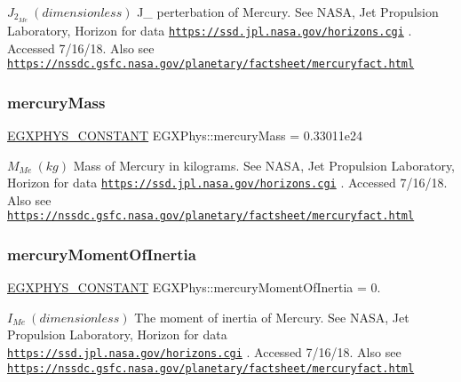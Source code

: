 $ J_{2}_{Me} \ (dimensionless)$ J\+\_ perterbation of Mercury. See N\+A\+SA, Jet Propulsion Laboratory, Horizon for data \href{https://ssd.jpl.nasa.gov/horizons.cgi}{\tt https\+://ssd.\+jpl.\+nasa.\+gov/horizons.\+cgi} . Accessed 7/16/18. Also see \href{https://nssdc.gsfc.nasa.gov/planetary/factsheet/mercuryfact.html}{\tt https\+://nssdc.\+gsfc.\+nasa.\+gov/planetary/factsheet/mercuryfact.\+html} \mbox{\label{group___e_g_x_phys-_constants-_astrophysics-_solar_system-_mercury-_bulk_gaa73eef341356108966e9633c7a70a992}} 
\subsubsection{\texorpdfstring{mercury\+Mass}{mercuryMass}}
{\footnotesize\ttfamily \mbox{\hyperlink{group___e_g_x_phys-_constants-_macros_ga76980d288494ce1714c9ac68a95ba702}{E\+G\+X\+P\+H\+Y\+S\+\_\+\+C\+O\+N\+S\+T\+A\+NT}} E\+G\+X\+Phys\+::mercury\+Mass = 0.\+33011e24}

$M_{Me} \ (kg)$ Mass of Mercury in kilograms. See N\+A\+SA, Jet Propulsion Laboratory, Horizon for data \href{https://ssd.jpl.nasa.gov/horizons.cgi}{\tt https\+://ssd.\+jpl.\+nasa.\+gov/horizons.\+cgi} . Accessed 7/16/18. Also see \href{https://nssdc.gsfc.nasa.gov/planetary/factsheet/mercuryfact.html}{\tt https\+://nssdc.\+gsfc.\+nasa.\+gov/planetary/factsheet/mercuryfact.\+html} \mbox{\label{group___e_g_x_phys-_constants-_astrophysics-_solar_system-_mercury-_bulk_ga54c31fac4e496e9e237656a5a24d6092}} 
\subsubsection{\texorpdfstring{mercury\+Moment\+Of\+Inertia}{mercuryMomentOfInertia}}
{\footnotesize\ttfamily \mbox{\hyperlink{group___e_g_x_phys-_constants-_macros_ga76980d288494ce1714c9ac68a95ba702}{E\+G\+X\+P\+H\+Y\+S\+\_\+\+C\+O\+N\+S\+T\+A\+NT}} E\+G\+X\+Phys\+::mercury\+Moment\+Of\+Inertia = 0.}

$ I_{Me} \ (dimensionless)$ The moment of inertia of Mercury. See N\+A\+SA, Jet Propulsion Laboratory, Horizon for data \href{https://ssd.jpl.nasa.gov/horizons.cgi}{\tt https\+://ssd.\+jpl.\+nasa.\+gov/horizons.\+cgi} . Accessed 7/16/18. Also see \href{https://nssdc.gsfc.nasa.gov/planetary/factsheet/mercuryfact.html}{\tt https\+://nssdc.\+gsfc.\+nasa.\+gov/planetary/factsheet/mercuryfact.\+html} \mbox{\label{group___e_g_x_phys-_constants-_astrophysics-_solar_system-_mercury-_bulk_ga393f8b6ff7abcaec833aed015879dc98}} 
